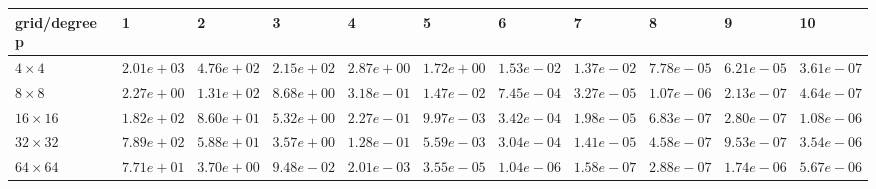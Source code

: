 \begin{tabular}{lllllllllll}
\hline
 grid/degree p   & 1          & 2          & 3          & 4          & 5          & 6          & 7          & 8          & 9          & 10         \\
\hline
 $4 \times 4$    & $2.01e+03$ & $4.76e+02$ & $2.15e+02$ & $2.87e+00$ & $1.72e+00$ & $1.53e-02$ & $1.37e-02$ & $7.78e-05$ & $6.21e-05$ & $3.61e-07$ \\
 $8 \times 8$    & $2.27e+00$ & $1.31e+02$ & $8.68e+00$ & $3.18e-01$ & $1.47e-02$ & $7.45e-04$ & $3.27e-05$ & $1.07e-06$ & $2.13e-07$ & $4.64e-07$ \\
 $16 \times 16$  & $1.82e+02$ & $8.60e+01$ & $5.32e+00$ & $2.27e-01$ & $9.97e-03$ & $3.42e-04$ & $1.98e-05$ & $6.83e-07$ & $2.80e-07$ & $1.08e-06$ \\
 $32 \times 32$  & $7.89e+02$ & $5.88e+01$ & $3.57e+00$ & $1.28e-01$ & $5.59e-03$ & $3.04e-04$ & $1.41e-05$ & $4.58e-07$ & $9.53e-07$ & $3.54e-06$ \\
 $64 \times 64$  & $7.71e+01$ & $3.70e+00$ & $9.48e-02$ & $2.01e-03$ & $3.55e-05$ & $1.04e-06$ & $1.58e-07$ & $2.88e-07$ & $1.74e-06$ & $5.67e-06$ \\
\hline
\end{tabular}